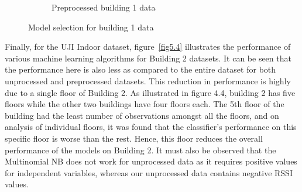 \documentclass[a4paper,singleside,12pt]{report} %
\begin{document}
\begin{figure}[!htb]
\begin{subfigure}[b]{0.48\linewidth}
			    \caption{Preprocessed building 1 data}
			  \end{subfigure}
			  \caption{Model selection for building 1 data}
			  \label{fig5.3}
			\end{figure} 
			
			Finally, for the UJI Indoor dataset, figure~\ref{fig5.4} illustrates the performance of various machine learning algorithms for Building 2 datasets. 
			It can be seen that the performance here is also less as compared to the entire dataset for both unprocessed and preprocessed datasets. 
			This reduction in performance is highly due to a single floor of Building 2. 
			As illustrated in figure 4.4, building 2 has five floors while the other two buildings have four floors each. 
			The 5th floor of the building had the least number of observations amongst all the floors, and on analysis of individual floors, it was found that the classifier's performance on this specific floor is worse than the rest. 
			Hence, this floor reduces the overall performance of the models on Building 2. 
			It must also be observed that the Multinomial NB does not work for unprocessed data as it requires positive values for independent variables, whereas our unprocessed data contains negative RSSI values. 
			
\end{document}
